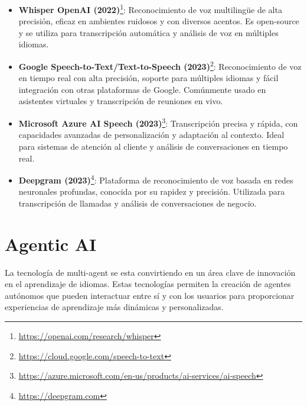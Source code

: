 \begin{itemize}
  \item \textbf{Whisper OpenAI (2022)}\footnote{\url{https://openai.com/research/whisper}}: Reconocimiento de voz multilingüe de alta precisión, eficaz en ambientes ruidosos y con diversos acentos. Es \gls{open-source} y se utiliza para transcripción automática y análisis de voz en múltiples idiomas.
  \item \textbf{Google Speech-to-Text/Text-to-Speech (2023)}\footnote{\url{https://cloud.google.com/speech-to-text}}: Reconocimiento de voz en tiempo real con alta precisión, soporte para múltiples idiomas y fácil integración con otras plataformas de Google. Comúnmente usado en asistentes virtuales y transcripción de reuniones en vivo.
  \item \textbf{Microsoft Azure AI Speech (2023)}\footnote{\url{https://azure.microsoft.com/en-us/products/ai-services/ai-speech}}: Transcripción precisa y rápida, con capacidades avanzadas de personalización y adaptación al contexto. Ideal para sistemas de atención al cliente y análisis de conversaciones en tiempo real.
  \item \textbf{Deepgram (2023)}\footnote{\url{https://deepgram.com}}: Plataforma de reconocimiento de voz basada en redes neuronales profundas, conocida por su rapidez y precisión. Utilizada para transcripción de llamadas y análisis de conversaciones de negocio.
\end{itemize}

\section{Agentic AI}

La tecnología de \gls{multi-agent} se esta convirtiendo en un área clave de innovación en el aprendizaje de idiomas. Estas tecnologías permiten la creación de agentes autónomos que pueden interactuar entre sí y con los usuarios para proporcionar experiencias de aprendizaje más dinámicas y personalizadas.

